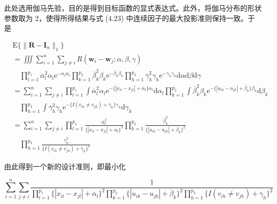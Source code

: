 \documentclass{ctexart}
\begin{document}
此处选用伽马先验，目的是得到目标函数的显式表达式。此外，将伽马分布的形状参数取为 2，使得所得结果与式 (4.23) 中连续因子的最大投影准则保持一致。于是

\begin{equation*}
\begin{aligned}
&\mathrm{E}\{\|\boldsymbol{R}-\boldsymbol{I}_n\|_1\}\\
&=\iiint\sum_{i=1}^{n}\sum_{j\neq i}R(\boldsymbol{w}_i-\boldsymbol{w}_j;\alpha,\beta,\gamma)\\
&\quad\prod_{l=1}^{p_1}\overline{\alpha}_l^2\alpha_l \mathrm{e}^{-\overline{\alpha}_l\alpha_l}
\prod_{k=1}^{p_2}\overline{\beta}_k^2\beta_k \mathrm{e}^{-\overline{\beta}_k\beta_k}
\prod_{h=1}^{p_3}\overline{\gamma}_h^2\gamma_h \mathrm{e}^{-\overline{\gamma}_h\gamma_h}\mathrm{d}\alpha \mathrm{d}\beta \mathrm{d}\gamma\\
&=\sum_{i=1}^{n}\sum_{j\neq i}
\prod_{l=1}^{p_1}\int \overline{\alpha}_l^2\alpha_l \mathrm{e}^{-\{|x_{il}-x_{jl}|+\overline{\alpha}_l\}\alpha_l}\mathrm{d}\alpha_l
\prod_{k=1}^{p_2}\int \overline{\beta}_k^2\beta_k \mathrm{e}^{-\{|u_{ik}-u_{jk}|+\overline{\beta}_k\}\beta_k}\mathrm{d}\beta_k\\
&\quad\prod_{h=1}^{p_3}\int \overline{\gamma}_h^2\gamma_h \mathrm{e}^{-\{I(v_{ih}\neq v_{jh})+\overline{\gamma}_h\}\gamma_h}\mathrm{d}\gamma_h\\
&=\sum_{i=1}^{n}\sum_{j\neq i}
\prod_{l=1}^{p_1}\frac{\overline{\alpha}_l^2}{\{|x_{il}-x_{jl}|+\overline{\alpha}_l\}^2}
\prod_{k=1}^{p_2}\frac{\overline{\beta}_k^2}{\{|u_{ik}-u_{jk}|+\overline{\beta}_k\}^2}\\
&\quad\prod_{h=1}^{p_3}\frac{\overline{\gamma}_h^2}{\{I(v_{ih}\neq v_{jh})+\overline{\gamma}_h\}^2}\end{aligned}
\end{equation*}

由此得到一个新的设计准则，即最小化

\begin{equation*}
\sum_{i=1}^{n}\sum_{j\neq i}
\frac{1}{\prod_{l=1}^{p_1}\{|x_{il}-x_{jl}|+\overline{\alpha}_l\}^2
\prod_{k=1}^{p_2}\{|u_{ik}-u_{jk}|+\overline{\beta}_k\}^2
\prod_{h=1}^{p_3}\{I(v_{ih}\neq v_{jh})+\overline{\gamma}_h\}^2}
\tag{4.32}
\end{equation*}
\end{document}
